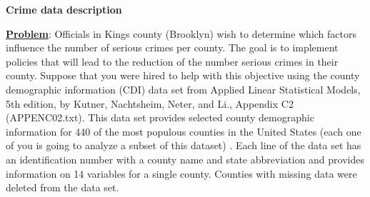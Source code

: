 \documentclass[9pt]{article}
\begin{document}
\baselineskip=22pt
\begin{center}
{\large \bf Crime data description}
\end{center}

\noindent \underline{\bf Problem}: Officials in Kings county (Brooklyn) wish to determine which factors  influence the number of serious crimes per county. 
The goal is to implement policies that will lead to the reduction of the number serious crimes in their county. Suppose that you were hired to help with this objective using
the  county demographic information (CDI) data set from Applied Linear Statistical Models, 5th edition, by Kutner, Nachtsheim, Neter, and Li., Appendix C2 (APPENC02.txt).
This data set provides selected county demographic information for 440 of the most  populous counties in the United States (each one of you is going to analyze a subset of this dataset) . Each line of the data set has an identification number with a county name and state abbreviation and provides information on 14 variables for a single county. Counties with missing data were deleted from the data set. 
\end{document}

